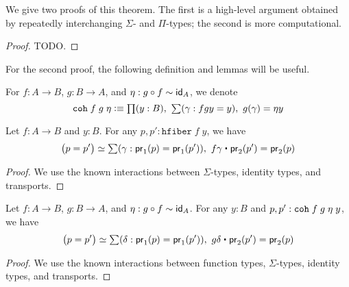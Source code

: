 We give two proofs of this theorem.
The first is a high-level argument obtained by repeatedly interchanging $\Sigma$- and $\Pi$-types; the second is more computational.

\begin{proof}
  TODO.
\end{proof}

For the second proof, the following definition and lemmas will be useful.

\begin{defn}
For $f : A \to B$, $g : B \to A$, and $\eta : g \circ f \sim \idfunc[A]$, we denote
\[ \coh{f}{g}{\eta} \defeq \prd{y : B} \sm{\gamma : fgy = y} g(\gamma) = \eta y \]
\end{defn}

\begin{lem}\label{lem:hfib}
Let $f : A \to B$ and $y : B$. For any $p, p' : \mathtt{hfiber} \; f \;y$, we have
\[ \big(p = p'\big) \simeq \sm{\gamma : \proj{1}(p) = \proj{1}(p')} f\gamma \ct \proj{2}(p') = \proj{2}(p) \]
\end{lem}
\begin{proof}
We use the known interactions between $\Sigma$-types, identity types, and transports.
\end{proof}

\begin{lem}\label{lem:coheq}
Let $f : A \to B$, $g : B \to A$, and $\eta : g \circ f \sim \idfunc[A]$. For any $y : B$ and $p, p' :\coh{f}{g}{\eta} \; y$, we have
\[ \big(p = p'\big) \simeq \sm{\delta : \proj{1}(p) = \proj{1}(p')} g \delta \ct \proj{2}(p') = \proj{2}(p) \]
\end{lem}
\begin{proof}
We use the known interactions between function types, $\Sigma$-types, identity types, and transports.
\end{proof}

